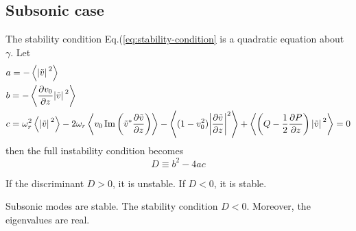 \documentclass{article}
\theoremstyle{plain}
\theoremstyle{definition}
\theoremstyle{remark}
\theoremstyle{remark}
\begin{document}
\subsection{Subsonic case}
The stability condition Eq.(\ref{eq:stability-condition} is a quadratic equation about $\gamma$. Let 
\begin{align*}
    &a = -\expval{\abs*{\tilde{v}}^2} \\
    &b = -\expval{\pdv{v_0}{z}\abs*{\tilde{v}}^2} \\
    &c = \omega_r^2\expval{\abs*{\tilde{v}}^2} 
    - 2\omega_r\expval{v_0 \Im\left(\tilde{v}^*\pdv{\tilde{v}}{z}\right)} 
    - \expval{(1-v_0^2)\abs{\pdv{\tilde{v}}{z}}^2 }
    + \expval{\left(Q-\frac{1}{2}\pdv{P}{z}\right)\abs*{\tilde{v}}^2} = 0
\end{align*}
then the full instability condition becomes 
\[ D \equiv b^2 - 4ac \]

If the discriminant $D>0$, it is unstable. If $D<0$, it is stable. 

Subsonic modes are stable. The stability condition $D<0$. Moreover, the eigenvalues are real.
\end{document}
